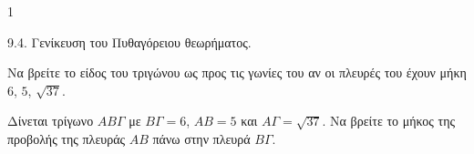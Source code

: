 \begin{ylh}{1}
    \item 9.4. Γενίκευση του Πυθαγόρειου θεωρήματος.
\end{ylh}
\begin{alist}
    \item Να βρείτε το είδος του τριγώνου ως προς τις γωνίες του αν οι πλευρές του έχουν μήκη $6$, $5$, $\sqrt{37}$. 
    \item Δίνεται τρίγωνο $ΑΒΓ$ με $ΒΓ=6$, $ΑΒ=5$ και $ΑΓ=\sqrt{37}$. Να βρείτε το μήκος της προβολής της πλευράς $ΑΒ$ πάνω στην πλευρά $ΒΓ$. 
\end{alist}